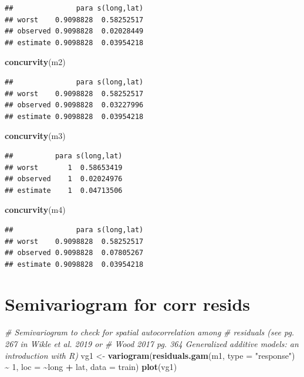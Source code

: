 \documentclass[
]{book}
\newenvironment{Shaded}{\begin{snugshade}}{\end{snugshade}}
\newcommand{\AttributeTok}[1]{\textcolor[rgb]{0.13,0.29,0.53}{#1}}
\newcommand{\CommentTok}[1]{\textcolor[rgb]{0.56,0.35,0.01}{\textit{#1}}}
\newcommand{\DecValTok}[1]{\textcolor[rgb]{0.00,0.00,0.81}{#1}}
\newcommand{\FunctionTok}[1]{\textcolor[rgb]{0.13,0.29,0.53}{\textbf{#1}}}
\newcommand{\NormalTok}[1]{#1}
\newcommand{\OtherTok}[1]{\textcolor[rgb]{0.56,0.35,0.01}{#1}}
\newcommand{\SpecialCharTok}[1]{\textcolor[rgb]{0.81,0.36,0.00}{\textbf{#1}}}
\newcommand{\StringTok}[1]{\textcolor[rgb]{0.31,0.60,0.02}{#1}}
\begin{document}
\begin{verbatim}
##               para s(long,lat)
## worst    0.9098828  0.58252517
## observed 0.9098828  0.02028449
## estimate 0.9098828  0.03954218
\end{verbatim}

\begin{Shaded}
\begin{Highlighting}[]
\FunctionTok{concurvity}\NormalTok{(m2)}
\end{Highlighting}
\end{Shaded}

\begin{verbatim}
##               para s(long,lat)
## worst    0.9098828  0.58252517
## observed 0.9098828  0.03227996
## estimate 0.9098828  0.03954218
\end{verbatim}

\begin{Shaded}
\begin{Highlighting}[]
\FunctionTok{concurvity}\NormalTok{(m3)}
\end{Highlighting}
\end{Shaded}

\begin{verbatim}
##          para s(long,lat)
## worst       1  0.58653419
## observed    1  0.02024976
## estimate    1  0.04713506
\end{verbatim}

\begin{Shaded}
\begin{Highlighting}[]
\FunctionTok{concurvity}\NormalTok{(m4)}
\end{Highlighting}
\end{Shaded}

\begin{verbatim}
##               para s(long,lat)
## worst    0.9098828  0.58252517
## observed 0.9098828  0.07805267
## estimate 0.9098828  0.03954218
\end{verbatim}

\hypertarget{semivariogram-for-corr-resids}{%
\section{Semivariogram for corr resids}\label{semivariogram-for-corr-resids}}

\begin{Shaded}
\begin{Highlighting}[]
\CommentTok{\# Semivariogram to check for spatial autocorrelation among}
\CommentTok{\# residuals (see pg. 267 in Wikle et al. 2019 or}
\CommentTok{\# Wood 2017 pg. 364 Generalized additive models: an introduction with R)}
\NormalTok{vg1 }\OtherTok{\textless{}{-}} \FunctionTok{variogram}\NormalTok{(}\FunctionTok{residuals.gam}\NormalTok{(m1, }\AttributeTok{type =} \StringTok{"response"}\NormalTok{) }\SpecialCharTok{\textasciitilde{}} \DecValTok{1}\NormalTok{, }\AttributeTok{loc =} \SpecialCharTok{\textasciitilde{}}\NormalTok{long }\SpecialCharTok{+}
\NormalTok{                  lat, }\AttributeTok{data =}\NormalTok{ train)}
\FunctionTok{plot}\NormalTok{(vg1)}
\end{Highlighting}
\end{Shaded}
\end{document}
